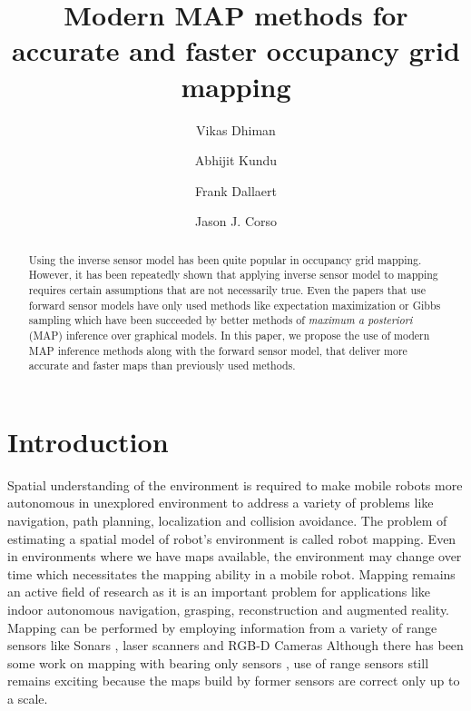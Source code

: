 \documentclass[letterpaper, 10 pt, conference]{ieeeconf} %
\title{\Large \bf
Modern MAP methods for accurate and faster occupancy grid mapping
}
\author[1]{Vikas Dhiman}
\author[2]{Abhijit Kundu}
\author[2]{Frank Dallaert}
\author[1]{Jason J. Corso}
\affil[1]{{\tt\small\{vikasdhi,jcorso\}@buffalo.edu}}
\affil[1]{ Department of Computer Science and Engineering, SUNY at Buffalo, NY, USA }
\affil[2]{{\tt\small\{abhijit.kundu,frank\}@gatech.edu}}
\affil[2]{College of Computing, Georgia Tech, GA, USA}
\begin{document}
\maketitle
\begin{abstract}
  Using the inverse sensor model has been quite popular in occupancy grid mapping.
  However, it has been repeatedly shown \cite{thrun2003learning,merali2013icra} 
  that applying inverse sensor model to mapping requires certain
  assumptions that are not necessarily true. Even the papers that use forward 
  sensor models have only used methods like expectation maximization
  or Gibbs sampling which have been succeeded by better methods of
  \emph{maximum a posteriori} (MAP) inference over graphical models.
  In this paper, we propose the use of modern MAP inference methods 
  \cite{kappes2013comparative} along with
  the forward sensor model, that deliver more accurate and faster maps than
  previously used methods.
\end{abstract}
\section{Introduction}

Spatial understanding of the environment is required to make mobile robots more
autonomous in unexplored environment to address a variety of problems like
navigation, path planning, localization and collision avoidance. 
The problem of estimating a spatial model of robot's
environment is called robot mapping\cite{thrun2002robotic}. Even in
environments where we have maps available, the environment may change over time
which necessitates the mapping ability in a mobile robot.
Mapping remains an active field of research \cite{meyer2012occupancy,nagla2012improved,merali2013icra}
as it is an important problem for
applications like indoor autonomous navigation, grasping, reconstruction and
augmented reality.
Mapping can be performed by employing information from a variety of range
sensors like Sonars \cite{thrun2003learning}, laser scanners \cite{merali2013icra}
and RGB-D Cameras \cite{newcombe2011kinectfusion}
Although there has been some work on mapping with bearing only sensors
\cite{davison2007monoslam,kundu2011realtime}, use of range sensors still
remains exciting because the maps build by former sensors are correct only up
to a scale.
\end{document}
